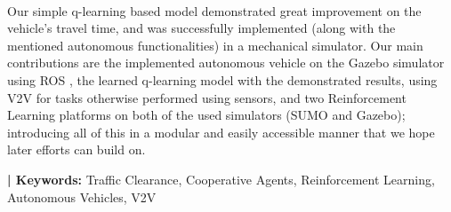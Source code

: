 \\
Our simple q-learning based model demonstrated great improvement on the vehicle's travel time, and was successfully implemented (along with the mentioned autonomous functionalities) in a mechanical simulator. Our main contributions are the implemented autonomous vehicle on the Gazebo \cite{Koenig04designand} simulator using ROS \cite{ROSBookMorgan}, the learned q-learning model with the demonstrated results, using V2V for tasks otherwise performed using sensors, and two Reinforcement Learning platforms on both of the used simulators (SUMO and Gazebo); introducing all of this in a modular and easily accessible manner that we hope later efforts can build on.


\vspace{.9em}
{\bf |  Keywords:} Traffic Clearance, Cooperative Agents, Reinforcement Learning, Autonomous Vehicles, V2V
